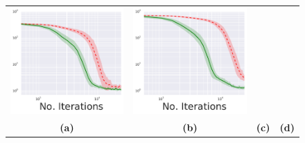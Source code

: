 \begin{figure}[t]
\begin{center}
\begin{tabular}{cccc}
		\includegraphics[scale=0.25]{./figs/duel_vs_Q_Q_10}&
		\includegraphics[scale=0.25]{./figs/duel_vs_Q_Q_20} \\
		{\bf (a)}& {\bf (b)} & {\bf (c)} & {\bf (d)} 
	\end{tabular}
	\vspace{-1em}

\end{center}
\end{figure}
